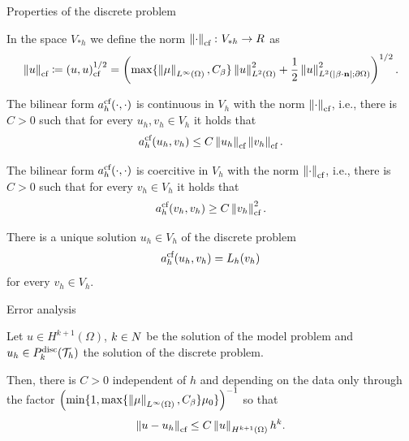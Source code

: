 	\begin{frame}[allowframebreaks]{Properties of the discrete problem}
	\begin{definicion}
		In the space $V_{*h}$ we define the norm $\left\|\cdot\right\|_{\text{cf}}\colon V_{*h}\to\relax R$ as {\small $$\left\|u\right\|_{\text{cf}}\coloneqq\left(u,u\right)_\text{cf}^{1/2}= \left(\max\{\left\|\mu\right\|_{L^\infty(\Omega)},C_\beta\}\left\|u\right\|_{L^2(\Omega)}^2+\frac{1}{2}\left\|u\right\|_{L^2(|\beta\cdot\mathbf{n}|;\partial\Omega)}^2\right)^{1/2}.$$}
	\end{definicion}
	\framebreak
	\begin{lemma}
		The bilinear form $a_h^{\text{cf}}(\cdot,\cdot)$ is continuous in $V_h$ with the norm $\left\|\cdot\right\|_{\text{cf}}$, i.e., there is $C>0$ such that for every $u_h,v_h\in V_h$ it holds that $$a_h^{\text{cf}}(u_h,v_h)\leq C\left\|u_h\right\|_{\text{cf}}\left\|v_h\right\|_{\text{cf}}.$$
	\end{lemma}
	
	\begin{lemma}
		The bilinear form $a_h^{\text{cf}}(\cdot,\cdot)$ is coercitive in $V_h$ with the norm $\left\|\cdot\right\|_{\text{cf}}$, i.e., there is $C>0$ such that for every $v_h\in V_h$ it holds that $$a_h^{\text{cf}}(v_h,v_h)\geq C\left\|v_h\right\|_{\text{cf}}^2.$$
	\end{lemma}
	\framebreak
	\begin{lemma}
		There is a unique solution $u_h\in V_h$ of the discrete problem $$a_h^{\text{cf}}(u_h,v_h)=L_h(v_h)$$ for every $v_h\in V_h$.
	\end{lemma}
	
	\end{frame}
	
	\begin{frame}{Error analysis}
	\begin{theorem}
		\label{theorem:hiperbolico_CF_orden_norma_CF}
		Let $u\in H^{k+1}(\Omega)$, $k\in\relax N$ be the solution of the model problem and $u_h\in \relax{P}^{\text{disc}}_k(\mathcal{T}_h)$ the solution of the discrete problem.
		
		Then, there is $C>0$ independent of $h$ and depending on the data only through the factor $\left(\min\{1,\max\{\left\|\mu\right\|_{L^\infty(\Omega)},C_\beta\}\mu_0\}\right)^{-1}$ so that
		\begin{equation*}
		\label{theorem:orden_convergencia_CF}
		\left\|u-u_h\right\|_{\text{cf}}\leq C\left\|u\right\|_{H^{k+1}(\Omega)}h^k.
		\end{equation*}
	\end{theorem}
	\end{frame}
	

